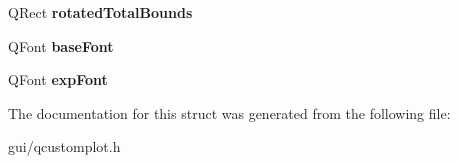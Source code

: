 \begin{DoxyCompactItemize}
\item 
\mbox{\label{structQCPAxisPainterPrivate_1_1TickLabelData_aa4d38c5ea47c9184a78ee33ae7f1012e}} 
Q\+Rect {\bfseries rotated\+Total\+Bounds}
\item 
\mbox{\label{structQCPAxisPainterPrivate_1_1TickLabelData_a0d4958a706debaa8d19a9b65fc090d56}} 
Q\+Font {\bfseries base\+Font}
\item 
\mbox{\label{structQCPAxisPainterPrivate_1_1TickLabelData_adc10767ebcb719d6927c012a38b9d933}} 
Q\+Font {\bfseries exp\+Font}
\end{DoxyCompactItemize}


The documentation for this struct was generated from the following file\+:\begin{DoxyCompactItemize}
\item 
gui/qcustomplot.\+h\end{DoxyCompactItemize}
